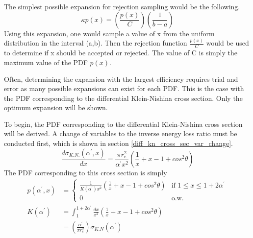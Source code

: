 The simplest possible expansion for rejection sampling would be the following.
\begin{equation*}
  \kappa p(x) = \left(\frac{p(x)}{C}\right)\left(\frac{1}{b-a}\right)
\end{equation*}
Using this expansion, one would sample a value of x from the uniform 
distribution in the interval (a,b). Then the rejection function $\frac{p(x)}{C}$
would be used to determine if x should be accepted or rejected. The value of
C is simply the maximum value of the PDF $p(x)$.

Often, determining the expansion with the largest efficiency requires trial and
error as many possible expansions can exist for each PDF. This is the case with
the PDF corresponding to the differential Klein-Nishina cross section. Only the 
optimum expansion will be shown.

To begin, the PDF corresponding to the differential Klein-Nishina cross section 
will be derived. A change of variables to the inverse energy loss ratio must
be conducted first, which is shown in section 
\ref{diff_kn_cross_sec_var_change}.
\begin{equation*}
  \frac{d\sigma_{K.N.}(\alpha^{'},x)}{dx} = \frac{\pi r_e^2}{\alpha^{'}x^2}
  \left(\frac{1}{x} + x - 1 + cos^2\theta \right)
\end{equation*}
The PDF corresponding to this cross section is simply
\begin{align}
  p(\alpha^{'},x) & = 
  \begin{cases}
    \frac{1}{K(\alpha^{'})x^2}\left(\frac{1}{x} + x - 1 + cos^2\theta \right)
    & \text{if } 1 \leq x \leq 1 + 2\alpha^{'} \\
    0 & \text{o.w.}
  \end{cases} \\
  K(\alpha^{'}) & = \int_1^{1+2\alpha^{'}} \frac{dx}{x^2}
  \left(\frac{1}{x}+x-1+cos^2\theta \right) \nonumber \\
  & = \left(\frac{\alpha^{'}}{\pi r_e^2}\right) \sigma_{K.N}(\alpha^{'})
\end{align}

